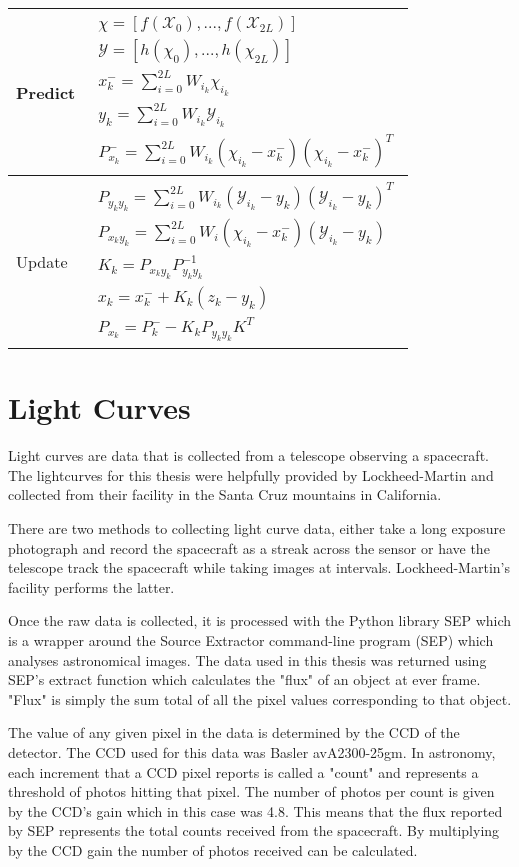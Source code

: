 \begin{center}
	\begin{tabular}{ | m{5em} | m{1cm}| } 
		\hline
		Predict & 
		\begin{align*}
		\chi = [f(\mathcal{X}_0),...,f(\mathcal{X}_{2L})]\\
		\mathcal{Y} = [h(\chi_0),...,h(\chi_{2L})]\\
		x^-_k = \sum_{i=0}^{2L}W_{i_k}\chi_{i_k}\\
		y_k = \sum_{i=0}^{2L}W_{i_k}\mathcal{Y}_{i_k}\\
		P^-_{x_k} = \sum_{i=0}^{2L}W_{i_k}(\chi_{i_k} - x^-_k)(\chi_{i_k} - x^-_k)^T
		\end{align*}\\ 
		\hline
		Update & 
		\begin{align*}
		P_{y_ky_k} = \sum_{i=0}^{2L}W_{i_k}(\mathcal{Y}_{i_k} - y_k)(\mathcal{Y}_{i_k} - y_k)^T \\
		P_{x_ky_k} = \sum_{i=0}^{2L}W_i(\chi_{i_k} - x^-_k)(\mathcal{Y}_{i_k} - y_k)\\
		K_{k} = P_{x_ky_k}P^{-1}_{y_ky_k} \\
		x_{k} = x^-_{k} + K_k(z_k - y_k) \\
		P_{x_k} = P^-_k - K_kP_{y_ky_k}K^T
		\end{align*}\\ 
		\hline
	\end{tabular}
\end{center}

\section{Light Curves}

Light curves are data that is collected from a telescope observing a spacecraft. The lightcurves for this thesis were helpfully provided by Lockheed-Martin and collected from their facility in the Santa Cruz mountains in California.

There are two methods to collecting light curve data, either take a long exposure photograph and record the spacecraft as a streak across the sensor or have the telescope track the spacecraft while taking images at intervals. Lockheed-Martin's facility performs the latter. 

Once the raw data is collected, it is processed with the Python library SEP which is a wrapper around the Source Extractor command-line program (SEP) which analyses astronomical images. The data used in this thesis was returned using SEP's extract function which calculates the "flux" of an object at ever frame. "Flux" is simply the sum total of all the pixel values corresponding to that object.

The value of any given pixel in the data is determined by the CCD of the detector. The CCD used for this data was Basler avA2300-25gm. In astronomy, each increment that a CCD pixel reports is called a "count" and represents a threshold of photos hitting that pixel. The number of photos per count is given by the CCD's gain which in this case was 4.8. This means that the flux reported by SEP represents the total counts received from the spacecraft. By multiplying by the CCD gain the number of photos received can be calculated.
